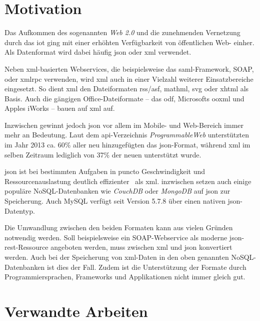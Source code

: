 \section{Motivation}
\label{sec:motivation}
Das Aufkommen des sogenannten \emph{Web 2.0} und die zunehmenden Vernetzung
durch das \gls{iot} ging mit einer erhöhten
Verfügbarkeit von öffentlichen Web- einher. Als Datenformat wird dabei
häufig \acrshort{json} oder \acrshort{xml} verwendet.

Neben \acrshort{xml}-basierten Webservices, die beispielsweise das \acrshort{saml}-Framework, SOAP,
oder \gls{xmlrpc} verwenden, wird \acrshort{xml} auch in einer Vielzahl weiterer
Einsatzbereiche eingesetzt. So dient \acrshort{xml} den Dateiformaten \acrshort{rss}/\acrshort{asf}, \acrshort{mathml},
\gls{svg} oder \gls{xhtml} als Basis. Auch die gängigen
Office-Dateiformate -- das \acrfull{odf}, Microsofts %
\acrfull{ooxml} und Apples iWorks -- bauen auf \acrshort{xml} auf. %

Inzwischen gewinnt jedoch \acrshort{json} vor allem im Mobile-
und Web-Bereich immer mehr an Bedeutung. Laut dem \acrshort{api}-Verzeichnis
\emph{ProgrammableWeb} unterstützten im Jahr 2013 ca. 60\% aller neu
hinzugefügten  das \acrshort{json}-Format, während
\acrshort{xml} im selben Zeitraum lediglich von 37\% der neuen 
unterstützt wurde.~\cite{duvander2013convergence}

\acrshort{json} ist bei bestimmten Aufgaben in puncto Geschwindigkeit und
Ressourcenauslastung deutlich effizienter~\cite{nurseitov2009comparison} als
\acrshort{xml}\@. inzwischen setzen auch einige populäre NoSQL-Datenbanken wie
\emph{CouchDB} oder \emph{MongoDB} auf \acrshort{json} zur Speicherung. Auch
MySQL verfügt seit Version 5.7.8 über einen nativen \acrshort{json}-Datentyp.

Die Umwandlung zwischen den beiden Formaten kann aus vielen Gründen
notwendig werden. Soll beispielsweise ein SOAP-Webservice als moderne
\acrshort{json}-\acrshort{rest}-Ressource angeboten werden, muss zwischen \acrshort{xml} und \acrshort{json} konvertiert
werden. Auch bei der Speicherung von \acrshort{xml}-Daten in den oben genannten NoSQL-Datenbanken
ist dies der Fall. Zudem ist die Unterstützung der Formate durch
Programmiersprachen, Frameworks und Applikationen nicht immer gleich gut.

\section{Verwandte Arbeiten}

